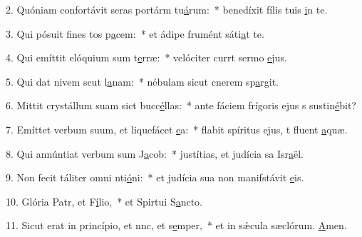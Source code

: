 2. Quóniam confortávit seras portárm tu\uline{á}rum:~* benedíxit fílis tuis \uline{i}n te.\par 
3. Qui pósuit fines tos p\uline{a}cem:~* et ádipe frumént sáti\uline{a}t te.\par 
4. Qui emíttit elóquium sum t\uline{e}rræ:~* velóciter currt sermo \uline{e}jus.\par 
5. Qui dat nivem scut l\uline{a}nam:~* nébulam sicut cnerem sp\uline{a}rgit.\par 
6. Mittit crystállum suam sict bucc\uline{é}llas:~* ante fáciem frígoris ejus s sustin\uline{é}bit?\par 
7. Emíttet verbum suum, et liquefácet \uline{e}a:~* flabit spíritus ejus, t fluent \uline{a}quæ.\par 
8. Qui annúntiat verbum sum J\uline{a}cob:~* justítias, et judícia sa Isr\uline{a}ël.\par 
9. Non fecit táliter omni nti\uline{ó}ni:~* et judícia sua non manifstávit \uline{e}is.\par 
10. Glória Patr, et F\uline{í}lio,~* et Spirtui S\uline{a}ncto.\par 
11. Sicut erat in princípio, et nnc, et s\uline{e}mper,~* et in sǽcula sæclórum. \uline{A}men.\par 

